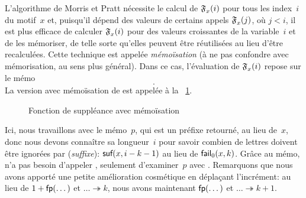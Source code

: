 L'algorithme de Morris et Pratt nécessite le calcul de
\(\mathfrak{F}_{x}^{}(i)\) pour tous les index~\(i\) du motif~\(x\) et,
puisqu'il dépend des valeurs de certains appels
\(\mathfrak{F}_{x}^{}(j)\), où \(j < i\), il est plus efficace de calculer
\(\mathfrak{F}_{x}^{}(i)\) pour des valeurs croissantes de la
variable~\(i\) et de les mémoriser, de telle sorte qu'elles peuvent
être réutilisées au lieu d'être recalculées. Cette technique est
appelée \emph{mémoïsation} (à ne pas confondre avec
mémorisation, au sens plus général). Dans ce cas, l'évaluation de
\(\mathfrak{F}_{x}^{}(i)\) repose sur le mémo
\begin{equation*}
[\pair{\ind{x}{i-1}}{\MPfailure{x}{}{i-1}},
\pair{\ind{x}{i-2}}{\MPfailure{x}{}{i-2}}, \dots,
\pair{\ind{x}{0}}{\MPfailure{x}{}{0}}].
\end{equation*}
La version avec mémoïsation de  est appelée
 à la \fig~\ref{fig:fail}.
\begin{figure}[b]
\centering
\abovedisplayskip=0pt
\belowdisplayskip=0pt
\caption{Fonction de suppléance avec mémoïsation}
\label{fig:fail}
\end{figure}
Ici, nous travaillons avec le mémo~\(p\), qui est un préfixe retourné,
au lieu de~\(x\), donc nous devons connaître sa longueur~\(i\) pour
savoir combien de lettres doivent être ignorées par
 (\emph{suffixe}):
\(\textsf{suf}(x,i-k-1)\) au lieu de \(\textsf{fail}_0(x,k)\). Grâce au
mémo,  n'a pas besoin d'appeler , seulement
d'examiner~\(p\) avec . Remarquons que nous avons apporté
une petite amélioration cosmétique en déplaçant l'incrément: au lieu
de \(1 + \textsf{fp}(\dots)\) et \(\dots \twoheadrightarrow k\), nous
avons maintenant \(\textsf{fp}(\dots)\) et \(\dots \twoheadrightarrow
k+1\).


